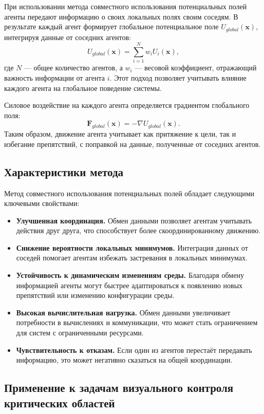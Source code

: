 При использовании метода совместного использования потенциальных полей агенты передают информацию о своих локальных полях своим соседям. В результате каждый агент формирует глобальное потенциальное поле \(U_{global}(\mathbf{x})\), интегрируя данные от соседних агентов:
\[
U_{global}(\mathbf{x}) = \sum_{i=1}^N w_i U_i(\mathbf{x}),
\]
где \(N\) — общее количество агентов, а \(w_i\) — весовой коэффициент, отражающий важность информации от агента \(i\). Этот подход позволяет учитывать влияние каждого агента на глобальное поведение системы.

Силовое воздействие на каждого агента определяется градиентом глобального поля:
\[
\mathbf{F}_{global}(\mathbf{x}) = -\nabla U_{global}(\mathbf{x}).
\]
Таким образом, движение агента учитывает как притяжение к цели, так и избегание препятствий, с поправкой на данные, полученные от соседних агентов.

\subsection{Характеристики метода}

Метод совместного использования потенциальных полей обладает следующими ключевыми свойствами:

\begin{itemize}
	\item \textbf{Улучшенная координация.} Обмен данными позволяет агентам учитывать действия друг друга, что способствует более скоординированному движению.
	\item \textbf{Снижение вероятности локальных минимумов.} Интеграция данных от соседей помогает агентам избежать застревания в локальных минимумах.
	\item \textbf{Устойчивость к динамическим изменениям среды.} Благодаря обмену информацией агенты могут быстрее адаптироваться к появлению новых препятствий или изменению конфигурации среды.
	\item \textbf{Высокая вычислительная нагрузка.} Обмен данными увеличивает потребности в вычислениях и коммуникации, что может стать ограничением для систем с ограниченными ресурсами.
	\item \textbf{Чувствительность к отказам.} Если один из агентов перестаёт передавать информацию, это может негативно сказаться на общей координации.
\end{itemize}

\subsection{Применение к задачам визуального контроля критических областей}

